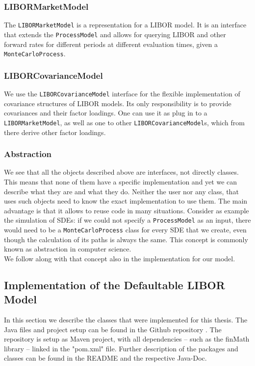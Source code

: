 \documentclass[12pt]{article}
\begin{document}
	\subsubsection*{LIBORMarketModel}
	The \texttt{LIBORMarketModel} is a representation for a LIBOR model. It is an interface that extends the \texttt{ProcessModel} and allows for querying LIBOR and other forward rates for different periods at different evaluation times, given a \texttt{MonteCarloProcess}.
	
	
	\subsubsection*{LIBORCovarianceModel}
	We use the \texttt{LIBORCovarianceModel} interface for the flexible implementation of covariance structures of LIBOR models. Its only responsibility is to provide covariances and their factor loadings. One can use it as plug in to a \texttt{LIBORMarketModel}, as well as one to other \texttt{LIBORCovarianceModel}s, which from there derive other factor loadings.
	
	
	\subsubsection*{Abstraction}
	We see that all the objects described above are interfaces, not directly classes.
	This means that none of them have a specific implementation and yet we can describe what they are and what they do. Neither the user nor any class, that uses such objects need to know the exact implementation to use them. The main advantage is that it allows to reuse code in many situations. Consider as example the simulation of SDEs: if we could not specify a \texttt{ProcessModel} as an input, there would need to be a \texttt{MonteCarloProcess} class for every SDE that we create, even though the calculation of its paths is always the same. This concept is commonly known as abstraction in computer science.\\
	We follow along with that concept also in the implementation for our model.
	
	
	
	\subsection{Implementation of the Defaultable LIBOR Model}
	In this section we describe the classes that were implemented for this thesis. The Java files and project setup can be found in the Github repository \cite{myJavaImplementation}. The repository is setup as Maven project, with all dependencies -- such as the finMath library -- linked in the "pom.xml" file. Further description of the packages and classes can be found in the README and the respective Java-Doc.
	
\end{document}
